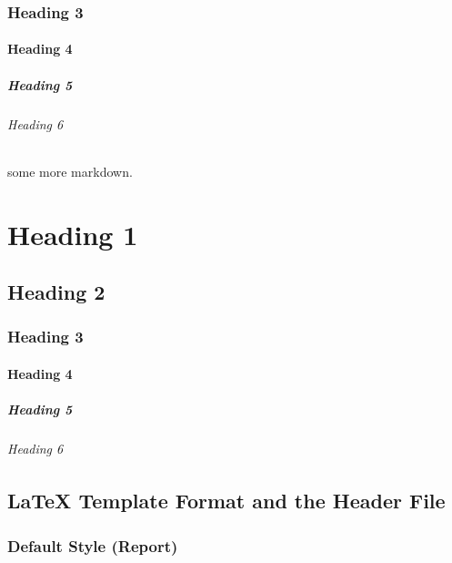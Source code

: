\documentclass[english]{workpackage}[1996/06/02]
\begin{document}
\subsection{Heading 3}
\label{sec:Heading3}


\subsubsection{Heading 4}
\label{sec:Heading4}


\paragraph{Heading 5}
\label{sec:Heading5}


\subparagraph{Heading 6}
\label{sec:Heading6}

some more markdown.



\chapter{Heading 1}
\label{sec:Heading1}


\section{Heading 2}
\label{sec:Heading2}


\subsection{Heading 3}
\label{sec:Heading3}


\subsubsection{Heading 4}
\label{sec:Heading4}


\paragraph{Heading 5}
\label{sec:Heading5}


\subparagraph{Heading 6}
\label{sec:Heading6}


\section{LaTeX Template Format and the Header File}
\label{sec:LaTeXTemplateFormatandtheHeaderFile}


\subsection{Default Style (Report)}
\label{sec:DefaultStyleReport}
\end{document}
